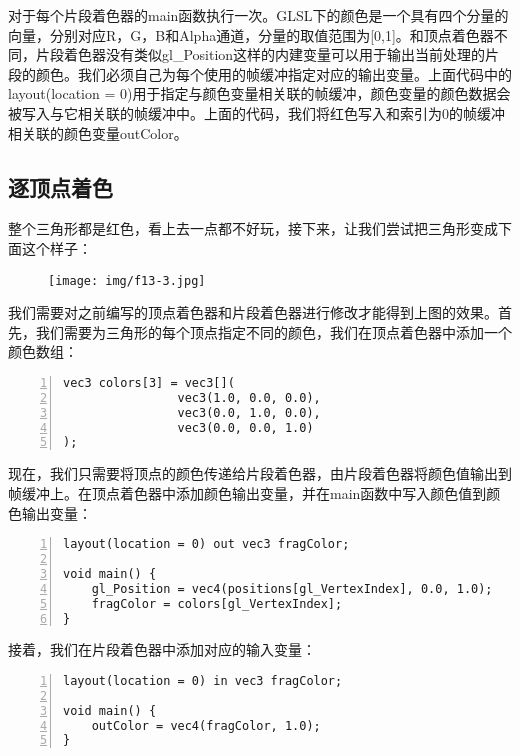 \documentclass{ctexart}
\begin{document}
对于每个片段着色器的main函数执行一次。GLSL下的颜色是一个具有四个分量的向量，分别对应R，G，B和Alpha通道，分量的取值范围为[0,1]。和顶点着色器不同，片段着色器没有类似gl\_Position这样的内建变量可以用于输出当前处理的片段的颜色。我们必须自己为每个使用的帧缓冲指定对应的输出变量。上面代码中的layout(location = 0)用于指定与颜色变量相关联的帧缓冲，颜色变量的颜色数据会被写入与它相关联的帧缓冲中。上面的代码，我们将红色写入和索引为0的帧缓冲相关联的颜色变量outColor。

\subsection{逐顶点着色}

整个三角形都是红色，看上去一点都不好玩，接下来，让我们尝试把三角形变成下面这个样子：

\begin{figure}[H]
	\centering
	\texttt{[image: img/f13-3.jpg]}
\end{figure}

我们需要对之前编写的顶点着色器和片段着色器进行修改才能得到上图的效果。首先，我们需要为三角形的每个顶点指定不同的颜色，我们在顶点着色器中添加一个颜色数组：

\begin{lstlisting}[language={[ANSI]C},keywordstyle=\color{blue!70},commentstyle=\color{red!50!green!50!blue!50},frame=shadowbox, rulesepcolor=\color{red!20!green!20!blue!20},basicstyle=\small,numbers=left, numberstyle=\tiny,breaklines=true]
vec3 colors[3] = vec3[](
				vec3(1.0, 0.0, 0.0),
				vec3(0.0, 1.0, 0.0),
				vec3(0.0, 0.0, 1.0)
);
\end{lstlisting}

现在，我们只需要将顶点的颜色传递给片段着色器，由片段着色器将颜色值输出到帧缓冲上。在顶点着色器中添加颜色输出变量，并在main函数中写入颜色值到颜色输出变量：

\begin{lstlisting}[language={[ANSI]C},keywordstyle=\color{blue!70},commentstyle=\color{red!50!green!50!blue!50},frame=shadowbox, rulesepcolor=\color{red!20!green!20!blue!20},basicstyle=\small,numbers=left, numberstyle=\tiny,breaklines=true]
layout(location = 0) out vec3 fragColor;

void main() {
	gl_Position = vec4(positions[gl_VertexIndex], 0.0, 1.0);
	fragColor = colors[gl_VertexIndex];
}
\end{lstlisting}

接着，我们在片段着色器中添加对应的输入变量：

\begin{lstlisting}[language={[ANSI]C},keywordstyle=\color{blue!70},commentstyle=\color{red!50!green!50!blue!50},frame=shadowbox, rulesepcolor=\color{red!20!green!20!blue!20},basicstyle=\small,numbers=left, numberstyle=\tiny,breaklines=true]
layout(location = 0) in vec3 fragColor;

void main() {
	outColor = vec4(fragColor, 1.0);
}
\end{lstlisting}
\end{document}

